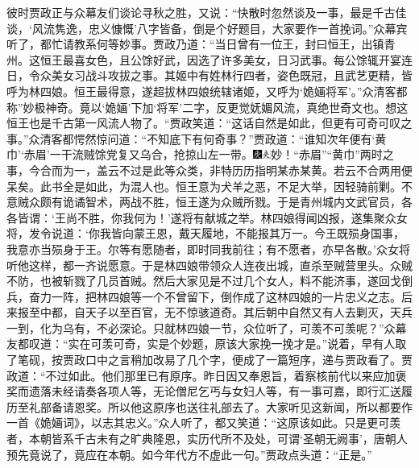 彼时贾政正与众幕友们谈论寻秋之胜，又说：“快散时忽然谈及一事，最是千古佳谈，‘风流隽逸，忠义慷慨’八字皆备，倒是个好题目，大家要作一首挽词。”众幕宾听了，都忙请教系何等妙事。贾政乃道：“当日曾有一位王，封曰恒王，出镇青州。这恒王最喜女色，且公馀好武，因选了许多美女，日习武事。每公馀辄开宴连日，令众美女习战斗攻拔之事。其姬中有姓林行四者，姿色既冠，且武艺更精，皆呼为林四娘。恒王最得意，遂超拔林四娘统辖诸姬，又呼为‘姽婳将军’。”众清客都称”妙极神奇。竟以‘姽婳’下加‘将军’二字，反更觉妩媚风流，真绝世奇文也。想这恒王也是千古第一风流人物了。“贾政笑道：“这话自然是如此，但更有可奇可叹之事。”众清客都愕然惊问道：“不知底下有何奇事？”贾政道：“谁知次年便有‘黄巾’‘赤眉’一干流贼馀党复又乌合，抢掠山左一带。{\includegraphics[width=3mm]{../Images/00004}\includegraphics[width=3mm]{../Images/00012}\footnotesize \kaishu 妙！“赤眉”“黄巾”两时之事，今合而为一，盖云不过是此等众类，非特历历指明某赤某黄。若云不合两用便呆矣。此书全是如此，为混人也。}恒王意为犬羊之恶，不足大举，因轻骑前剿。不意贼众颇有诡谲智术，两战不胜，恒王遂为众贼所戮。于是青州城内文武官员，各各皆谓：‘王尚不胜，你我何为！’遂将有献城之举。林四娘得闻凶报，遂集聚众女将，发令说道：‘你我皆向蒙王恩，戴天履地，不能报其万一。今王既殒身国事，我意亦当殒身于王。尔等有愿随者，即时同我前往；有不愿者，亦早各散。’众女将听他这样，都一齐说愿意。于是林四娘带领众人连夜出城，直杀至贼营里头。众贼不防，也被斩戮了几员首贼。然后大家见是不过几个女人，料不能济事，遂回戈倒兵，奋力一阵，把林四娘等一个不曾留下，倒作成了这林四娘的一片忠义之志。后来报至中都，自天子以至百官，无不惊骇道奇。其后朝中自然又有人去剿灭，天兵一到，化为乌有，不必深论。只就林四娘一节，众位听了，可羡不可羡呢？”众幕友都叹道：“实在可羡可奇，实是个妙题，原该大家挽一挽才是。”说着，早有人取了笔砚，按贾政口中之言稍加改易了几个字，便成了一篇短序，递与贾政看了。贾政道：“不过如此。他们那里已有原序。昨日因又奉恩旨，着察核前代以来应加褒奖而遗落未经请奏各项人等，无论僧尼乞丐与女妇人等，有一事可嘉，即行汇送履历至礼部备请恩奖。所以他这原序也送往礼部去了。大家听见这新闻，所以都要作一首《姽婳词》，以志其忠义。”众人听了，都又笑道：“这原该如此。只是更可羡者，本朝皆系千古未有之旷典隆恩，实历代所不及处，可谓‘圣朝无阙事’，唐朝人预先竟说了，竟应在本朝。如今年代方不虚此一句。”贾政点头道：“正是。”

